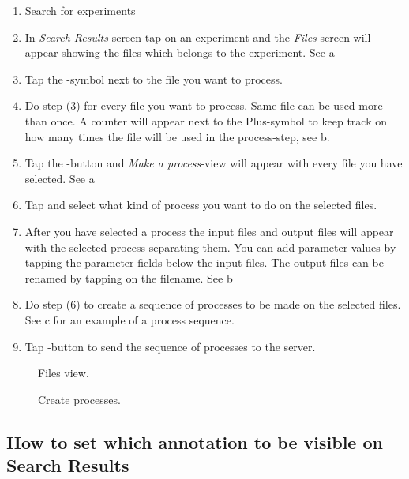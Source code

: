 \begin{enumerate}
\item Search for experiments
\item In \emph{Search Results}-screen tap on an experiment and the \emph{Files}-screen will appear showing the files which belongs to the experiment. See a
\item Tap the -symbol next to the file you want to process.
\item Do step (3) for every file you want to process. Same file can be used more than once. A counter will appear next to the Plus-symbol to keep track on how many times the file will be used in the process-step, see b.
\item Tap the -button and \emph{Make a process}-view will appear with every file you have selected. See a
\item Tap  and select what kind of process you want to do on the selected files.
\item After you have selected a process the input files and output files will appear with the selected process separating them. You can add parameter values by tapping the parameter fields below the input files. The output files can be renamed by tapping on the filename. See b
\item Do step (6) to create a sequence of processes to be made on the selected files. See c for an example of a process sequence.

\item Tap -button to send the sequence of processes to the server.
\end{enumerate}


\begin{figure}[htb]
\caption{Files view.}
\label{fig:ios_files_view}
\end{figure}
\FloatBarrier

\begin{figure}[htb]
\caption{Create processes.}
\label{fig:ios_make_process_view}
\end{figure}
\FloatBarrier


\subsection{How to set which annotation to be visible on Search Results}

